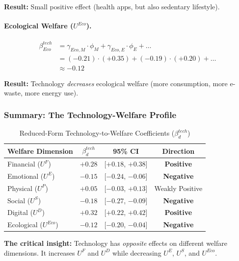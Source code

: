\textbf{Result:} Small positive effect (health apps, but also sedentary lifestyle).

\paragraph{Ecological Welfare ($U^{Eco}$).}
\begin{align}
\beta_{Eco}^{tech} &= \gamma_{Eco,M} \cdot \phi_M + \gamma_{Eco,E} \cdot \phi_E + \ldots \nonumber \\
&= (-0.21) \cdot (+0.35) + (-0.19) \cdot (+0.20) + \ldots \nonumber \\
&\approx \mathbf{-0.12}
\end{align}

\textbf{Result:} Technology \emph{decreases} ecological welfare (more consumption, 
more e-waste, more energy use).

\subsubsection{Summary: The Technology-Welfare Profile}

\begin{table}[htbp]
\centering
\caption{Reduced-Form Technology-to-Welfare Coefficients ($\beta_d^{tech}$)}
\label{tab:beta-tech}
\begin{tabular}{@{}lccc@{}}
\toprule
\textbf{Welfare Dimension} & \textbf{$\beta_d^{tech}$} & \textbf{95\% CI} & \textbf{Direction} \\
\midrule
Financial ($U^F$) & $+0.28$ & [$+0.18$, $+0.38$] & \textbf{Positive} \\
Emotional ($U^E$) & $-0.15$ & [$-0.24$, $-0.06$] & \textbf{Negative} \\
Physical ($U^P$) & $+0.05$ & [$-0.03$, $+0.13$] & Weakly Positive \\
Social ($U^S$) & $-0.18$ & [$-0.27$, $-0.09$] & \textbf{Negative} \\
Digital ($U^D$) & $+0.32$ & [$+0.22$, $+0.42$] & \textbf{Positive} \\
Ecological ($U^{Eco}$) & $-0.12$ & [$-0.20$, $-0.04$] & \textbf{Negative} \\
\bottomrule
\end{tabular}
\end{table}

\textbf{The critical insight:} Technology has \emph{opposite} effects on different 
welfare dimensions. It increases $U^F$ and $U^D$ while decreasing $U^E$, $U^S$, 
and $U^{Eco}$.


